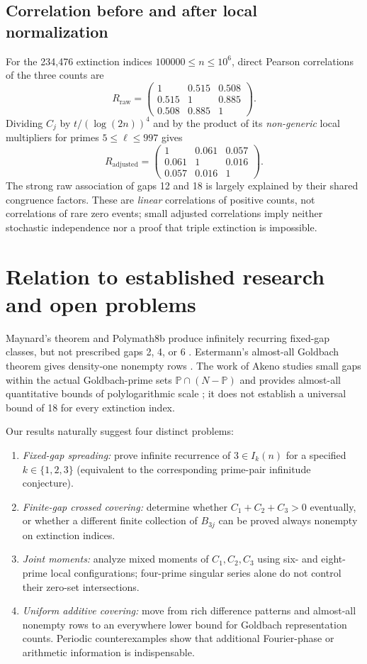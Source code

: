 \documentclass[11pt,a4paper]{article}
\theoremstyle{definition}
\newcommand{\PP}{\mathbb P}
\begin{document}
\subsection{Correlation before and after local normalization}
For the 234,476 extinction indices $100000\le n\le10^6$, direct Pearson correlations of the three counts are
\[
 R_{\mathrm{raw}}=\begin{pmatrix}
 1&0.515&0.508\\0.515&1&0.885\\0.508&0.885&1
\end{pmatrix}.
\]
Dividing $C_j$ by $t/(\log(2n))^4$ and by the product of its \emph{non-generic} local multipliers for primes $5\le\ell\le997$ gives
\[
 R_{\mathrm{adjusted}}=\begin{pmatrix}
 1&0.061&0.057\\0.061&1&0.016\\0.057&0.016&1
\end{pmatrix}.
\]
The strong raw association of gaps 12 and 18 is largely explained by their shared congruence factors. These are \emph{linear} correlations of positive counts, not correlations of rare zero events; small adjusted correlations imply neither stochastic independence nor a proof that triple extinction is impossible.

\section{Relation to established research and open problems}
Maynard's theorem and Polymath8b produce infinitely recurring fixed-gap classes, but not prescribed gaps 2, 4, or 6 \cite{Maynard2015,Polymath2014}. Estermann's almost-all Goldbach theorem gives density-one nonempty rows \cite{Estermann1938}. The work of Akeno studies small gaps within the actual Goldbach-prime sets $\PP\cap(N-\PP)$ and provides almost-all quantitative bounds of polylogarithmic scale \cite{Akeno2025}; it does not establish a universal bound of 18 for every extinction index.

Our results naturally suggest four distinct problems:
\begin{enumerate}[topsep=2pt,itemsep=3pt]
\item \emph{Fixed-gap spreading:} prove infinite recurrence of $3\in I_k(n)$ for a specified $k\in\{1,2,3\}$ (equivalent to the corresponding prime-pair infinitude conjecture).
\item \emph{Finite-gap crossed covering:} determine whether $C_1+C_2+C_3>0$ eventually, or whether a different finite collection of $B_{3j}$ can be proved always nonempty on extinction indices.
\item \emph{Joint moments:} analyze mixed moments of $C_1,C_2,C_3$ using six- and eight-prime local configurations; four-prime singular series alone do not control their zero-set intersections.
\item \emph{Uniform additive covering:} move from rich difference patterns and almost-all nonempty rows to an everywhere lower bound for Goldbach representation counts. Periodic counterexamples show that additional Fourier-phase or arithmetic information is indispensable.
\end{enumerate}
\end{document}
